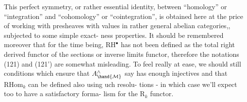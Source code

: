 \hand{\uline{\textcolor{black}{Remarks}}} This perfect symmetry, or rather essential identity, between
``homology'' or ``integration'' and ``cohomology'' or ``cointegration'', is
obtained here at the price of working with presheaves with values in
rather general abelian categories,, subjected to some simple exact-%
ness properties. It should be remembered moreover that for the time
being, RH$^{\bullet}$ has not been defined as the total right derived functor of
the sections or  inverse limits functor, therefore the notations
(121) and (121') are somewhat misleading. To feel really at ease, we
should  still  conditions which ensure that $A^{\wedge}_{\hand{\mathcal{M}}}$ say has
enough injectives and that RHom$_{k}$ can be defined also using uch resolu-%
tions - in which case we'll expect too to have a satisfactory forma-%
lism for the R\hand{\uline{\textcolor{black}{Hom}}}$_{k}$ functor.

